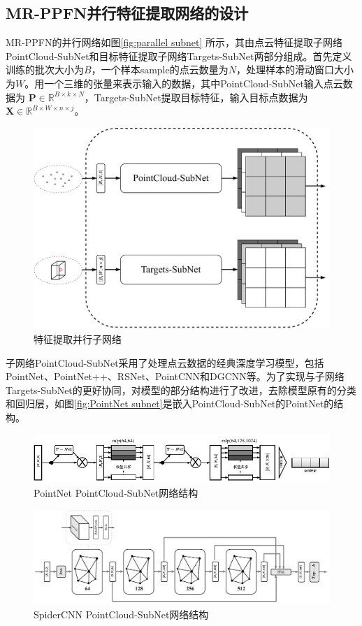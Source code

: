 \subsection{MR-PPFN并行特征提取网络的设计}
MR-PPFN的并行网络如图\eqref{fig:parallel subnet}
所示，其由点云特征提取子网络PointCloud-SubNet和目标特征提取子网络Targets-SubNet两部分组成。首先定义训练的批次大小为$B$，一个样本sample的点云数量为$N$，处理样本的滑动窗口大小为$W$。用一个三维的张量来表示输入的数据，其中PointCloud-SubNet输入点云数据为  \( \mathbf{P} \in \mathbb{R}^{B \times k \times N} \)，Targets-SubNet提取目标特征，输入目标点数据为\( \mathbf{X} \in \mathbb{R}^{B \times W \times n \times j} \)。
\begin{figure}[htbp]
    \centering
    \includegraphics[width=0.8\linewidth]{imgs/parallel subnet.pdf}
    \caption{特征提取并行子网络}
    \label{fig:parallel subnet}
\end{figure}

子网络PointCloud-SubNet采用了处理点云数据的经典深度学习模型，包括PointNet、PointNet++、RSNet、PointCNN和DGCNN等。为了实现与子网络Targets-SubNet的更好协同，对模型的部分结构进行了改进，去除模型原有的分类和回归层，如图\eqref{fig:PointNet subnet}是嵌入PointCloud-SubNet的PointNet的结构。
\begin{figure}[htbp]
    \centering
    \includegraphics[width=1\linewidth]{imgs/pointnet.pdf}
    \caption{PointNet PointCloud-SubNet网络结构}
    \label{fig:PointNet subnet}
\end{figure}

\begin{figure}[htbp]
    \centering
    \includegraphics[width=1\linewidth]{imgs/spidercnn subnet.pdf}
    \caption{SpiderCNN PointCloud-SubNet网络结构}
    \label{fig:SpiderCNN subnet}
\end{figure}

